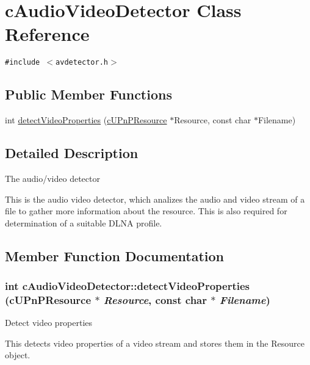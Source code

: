 \hypertarget{classcAudioVideoDetector}{
\section{cAudioVideoDetector Class Reference}
\label{classcAudioVideoDetector}
}
{\tt \#include $<$avdetector.h$>$}

\subsection*{Public Member Functions}
\begin{CompactItemize}
\item 
int \hyperlink{classcAudioVideoDetector_0a376b4d1421f0d799189d4e03c4cbcc}{detectVideoProperties} (\hyperlink{classcUPnPResource}{cUPnPResource} $\ast$Resource, const char $\ast$Filename)
\end{CompactItemize}


\subsection{Detailed Description}
The audio/video detector

This is the audio video detector, which analizes the audio and video stream of a file to gather more information about the resource. This is also required for determination of a suitable DLNA profile. 

\subsection{Member Function Documentation}
\hypertarget{classcAudioVideoDetector_0a376b4d1421f0d799189d4e03c4cbcc}{
\subsubsection[{detectVideoProperties}]{\setlength{\rightskip}{0pt plus 5cm}int cAudioVideoDetector::detectVideoProperties ({\bf cUPnPResource} $\ast$ {\em Resource}, \/  const char $\ast$ {\em Filename})}}
\label{classcAudioVideoDetector_0a376b4d1421f0d799189d4e03c4cbcc}


Detect video properties

This detects video properties of a video stream and stores them in the Resource object.

